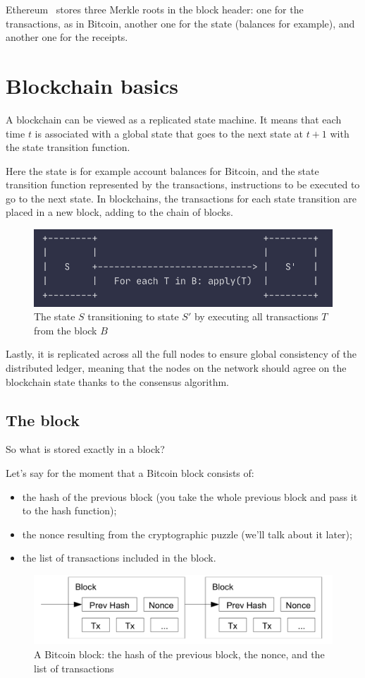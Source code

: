 Ethereum~\cite{Buterin..13} stores three Merkle roots in the block header: one for the transactions, as in Bitcoin, another one for the state (balances for example), and another one for the receipts. 




\section{Blockchain basics}

A blockchain can be viewed as a replicated state machine. It means that  each time $t$ is associated with a global state that goes to the next state at $t+1$ with the state transition function. 

Here the state is for example account balances for Bitcoin, and the state transition function represented by the transactions, instructions to be executed to go to the next state.
In blockchains, the transactions for each state transition are placed in a new block, adding to the chain of blocks.
\begin{figure}[H]
\centering
\includegraphics[width=0.6\linewidth]{background/state_transition.png}
    \caption{The state $S$ transitioning to state $S'$ by executing all transactions $T$ from the block $B$ \cite{statemachine}}
    \label{fig:state_transition}
\end{figure}
Lastly, it is replicated across all the full nodes to ensure global consistency of the distributed ledger, meaning that the nodes on the network should agree on the blockchain state thanks to the consensus algorithm.

\subsection{The block}
So what is stored exactly in a block? 

Let's say for the moment that a Bitcoin block consists of:
\begin{itemize}
    \item the hash of the previous block (you take the whole previous block and pass it to the hash function);
    \item the nonce resulting from the cryptographic puzzle (we'll talk about it later); 
    \item the list of transactions included in the block.
\end{itemize}
\begin{figure}[H]
    \centering
\includegraphics[width=0.6\linewidth]{background/block.png}
    \caption{A Bitcoin block: the hash of the previous block, the nonce, and the list of transactions \cite{Nakamoto..09}}
    \label{fig:block}
\end{figure}

